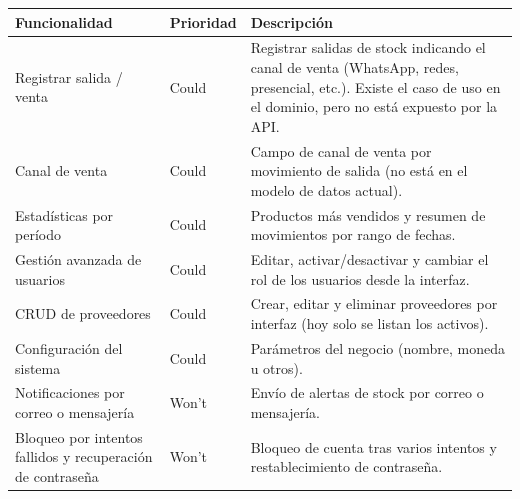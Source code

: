\documentclass[12pt, a4paper]{article}
\begin{document}
\begin{center}
\renewcommand{\arraystretch}{1.4}
\begin{tabular}{|L{5.5cm}|L{2.5cm}|L{8cm}|}
\hline
\textbf{Funcionalidad} & \textbf{Prioridad} & \textbf{Descripción} \\
\hline
Registrar salida / venta & Could & Registrar salidas de stock indicando el canal de venta (WhatsApp, redes, presencial, etc.). Existe el caso de uso en el dominio, pero no está expuesto por la API. \\
\hline
Canal de venta & Could & Campo de canal de venta por movimiento de salida (no está en el modelo de datos actual). \\
\hline
Estadísticas por período & Could & Productos más vendidos y resumen de movimientos por rango de fechas. \\
\hline
Gestión avanzada de usuarios & Could & Editar, activar/desactivar y cambiar el rol de los usuarios desde la interfaz. \\
\hline
CRUD de proveedores & Could & Crear, editar y eliminar proveedores por interfaz (hoy solo se listan los activos). \\
\hline
Configuración del sistema & Could & Parámetros del negocio (nombre, moneda u otros). \\
\hline
Notificaciones por correo o mensajería & Won't & Envío de alertas de stock por correo o mensajería. \\
\hline
Bloqueo por intentos fallidos y recuperación de contraseña & Won't & Bloqueo de cuenta tras varios intentos y restablecimiento de contraseña. \\
\hline
\end{tabular}
\end{center}
\end{document}
